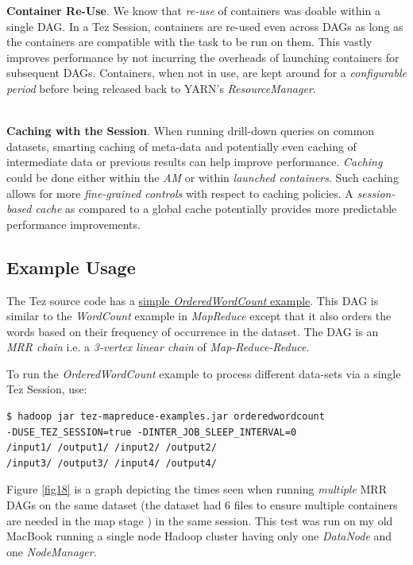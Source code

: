 \documentclass[twocolumn]{article}
\begin{document}
\textbf{Container Re-Use}. We know that \emph{re-use} of containers was
doable within a single DAG. In a Tez Session, containers are re-used
even across DAGs as long as the containers are compatible with the task
to be run on them. This vastly improves performance by not incurring the
overheads of launching containers for subsequent DAGs. Containers, when
not in use, are kept around for a \emph{configurable period} before
being released back to YARN's \emph{ResourceManager}.

\noindent
\\
\textbf{Caching with the Session}. When running drill-down queries on
common datasets, smarting caching of meta-data and potentially even
caching of intermediate data or previous results can help improve
performance. \emph{Caching} could be done either within the \emph{AM}
or within \emph{launched containers}. Such caching allows for more
\emph{fine-grained controls} with respect to caching policies. A
\emph{session-based cache} as compared to a global cache potentially
provides more predictable performance improvements.

\subsection{Example Usage}

The Tez source code has a
\href{https://git-wip-us.apache.org/repos/asf?p=incubator-tez.git;a=blob_plain;f=tez-mapreduce-examples/src/main/java/org/apache/tez/mapreduce/examples/OrderedWordCount.java;hb=master}{simple
\emph{OrderedWordCount} example}. This DAG is similar to the
\emph{WordCount} example in \emph{MapReduce} except that it also
orders the words based on their frequency of occurrence in the dataset.
The DAG is an \emph{MRR chain} i.e. a \emph{3-vertex linear chain} of
\emph{Map-Reduce-Reduce}.

To run the \emph{OrderedWordCount} example to process different
data-sets via a single Tez Session, use:

{\scriptsize
\begin{verbatim}
$ hadoop jar tez-mapreduce-examples.jar orderedwordcount 
-DUSE_TEZ_SESSION=true -DINTER_JOB_SLEEP_INTERVAL=0
/input1/ /output1/ /input2/ /output2/ 
/input3/ /output3/ /input4/ /output4/
\end{verbatim}
}

Figure \ref{fig18} is a graph depicting the times seen when running \emph{multiple}
MRR DAGs on the same dataset (the dataset had 6 files to ensure multiple
containers are needed in the map stage ) in the same session. This test
was run on my old MacBook running a single node Hadoop cluster having
only one \emph{DataNode} and one \emph{NodeManager}.
\end{document}
